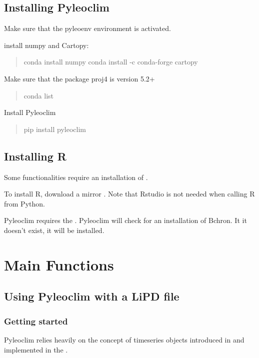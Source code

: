\documentclass[letterpaper,10pt,english]{sphinxmanual}
\begin{document}
\section{Installing Pyleoclim}
\label{\detokenize{Installation:installing-pyleoclim}}
Make sure that the pyleoenv environment is activated.

 install numpy and Cartopy:
\begin{quote}

conda install numpy
conda install -c conda-forge cartopy
\end{quote}

Make sure that the package proj4 is version 5.2+
\begin{quote}

conda list
\end{quote}

Install Pyleoclim
\begin{quote}

pip install pyleoclim
\end{quote}


\section{Installing R}
\label{\detokenize{Installation:installing-r}}
Some functionalities require an installation of .

To install R, download a mirror .
Note that Rstudio is not needed when calling R from Python.

Pyleoclim requires the . Pyleoclim will check for an installation of Bchron. It it doesn’t exist, it will be installed.


\chapter{Main Functions}
\label{\detokenize{Main:main-functions}}\label{\detokenize{Main::doc}}

\section{Using Pyleoclim with a LiPD file}
\label{\detokenize{Main:using-pyleoclim-with-a-lipd-file}}

\subsection{Getting started}
\label{\detokenize{Main:getting-started}}
Pyleoclim relies heavily on the concept of timeseries objects introduced in
 and implemented in the
.
\end{document}

